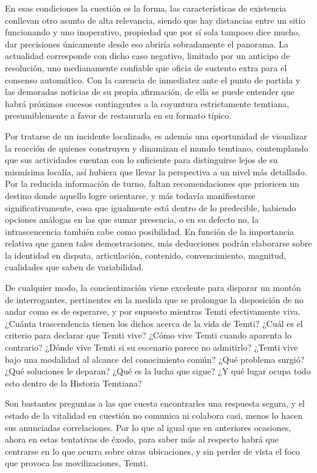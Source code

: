 \documentclass[
]{book}
\begin{document}
En esas condiciones la cuestión es la forma, las características de existencia conllevan otro asunto de alta relevancia, siendo que hay distancias entre un sitio funcionando y uno inoperativo, propiedad que por sí sola tampoco dice mucho, dar precisiones únicamente desde eso abriría sobradamente el panorama. La actualidad corresponde con dicho caso negativo, limitado por un anticipo de resolución, uno medianamente confiable que oficia de sustento extra para el consenso automático. Con la carencia de inmediatez ante el punto de partida y las demoradas noticias de su propia afirmación, de ella se puede entender que habrá próximos sucesos contingentes a la coyuntura estrictamente temtiana, presumiblemente a favor de restaurarla en su formato típico.

Por tratarse de un incidente localizado, es además una oportunidad de visualizar la reacción de quienes construyen y dinamizan el mundo temtiano, contemplando que sus actividades cuentan con lo suficiente para distinguirse lejos de su mismísima localía, así hubiera que llevar la perspectiva a un nivel más detallado. Por la reducida información de turno, faltan recomendaciones que prioricen un destino donde aquello logre orientarse, y más todavía manifiestarse significativamente, cosa que igualmente está dentro de lo predecible, habiendo opciones análogas en las que sumar presencia, o en su defecto no, la intrascencencia también cabe como posibilidad. En función de la importancia relativa que ganen tales demostraciones, más deducciones podrán elaborarse sobre la identidad en disputa, articulación, contenido, convencimiento, magnitud, cualidades que saben de variabilidad.

De cualquier modo, la concientización viene excelente para disparar un montón de interrogantes, pertinentes en la medida que se prolongue la disposición de no andar como es de esperarse, y por supuesto mientras Temti efectivamente viva. ¿Cuánta trascendencia tienen los dichos acerca de la vida de Temti? ¿Cuál es el criterio para declarar que Temti vive? ¿Cómo vive Temti cuando aparenta lo contrario? ¿Dónde vive Temti si su escenario parece no admitirlo? ¿Temti vive bajo una modalidad al alcance del conocimiento común? ¿Qué problema surgió? ¿Qué soluciones le deparan? ¿Qué es la lucha que sigue? ¿Y qué lugar ocupa todo esto dentro de la Historia Temtiana?

Son bastantes preguntas a las que cuesta encontrarles una respuesta segura, y el estado de la vitalidad en cuestión no comunica ni colabora casi, menos lo hacen sus anunciadas correlaciones. Por lo que al igual que en anteriores ocasiones, ahora en estas tentativas de éxodo, para saber más al respecto habrá que centrarse en lo que ocurra sobre otras ubicaciones, y sin perder de vista el foco que provoca las movilizaciones, Temti.
\end{document}
